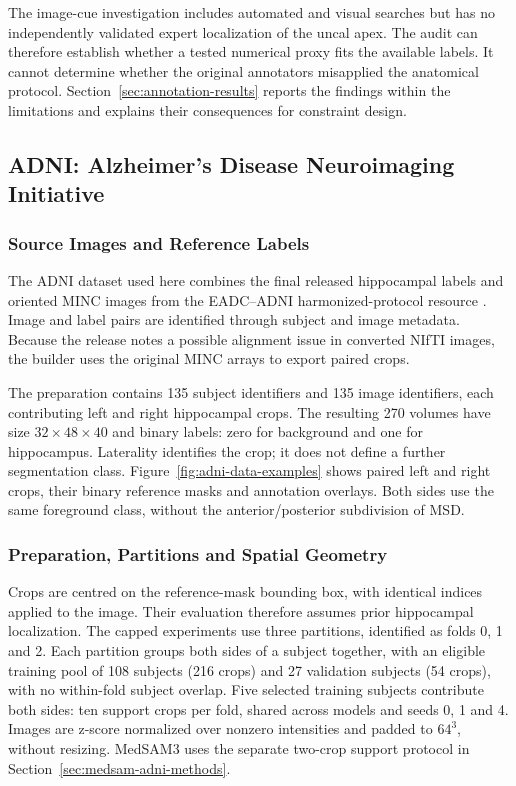 \documentclass[12pt,a4paper]{article}
\begin{document}
The image-cue investigation includes automated and visual searches but
has no independently validated expert localization of the uncal apex.
The audit can therefore establish whether a tested numerical proxy fits
the available labels. It cannot determine whether the original annotators
misapplied the anatomical protocol. Section~\ref{sec:annotation-results}
reports the findings within the limitations and explains their
consequences for constraint design.



\subsection{ADNI: Alzheimer's Disease Neuroimaging Initiative}
\label{sec:adni-methods}

\subsubsection{Source Images and Reference Labels}

The ADNI dataset used here combines the final released hippocampal labels
and oriented MINC images from the EADC--ADNI harmonized-protocol resource
\cite{harpReleasedLabels}. Image and label pairs are identified through
subject and image metadata. Because the release notes a possible
alignment issue in converted NIfTI images, the builder uses the
original MINC arrays to export paired crops.

The preparation contains 135 subject identifiers and 135 image
identifiers, each contributing left and right hippocampal crops.
The resulting 270 volumes have size $32\times48\times40$ and binary
labels: zero for background and one for hippocampus. Laterality
identifies the crop; it does not define a further segmentation class.
Figure~\ref{fig:adni-data-examples} shows paired left and right crops,
their binary reference masks and annotation overlays. Both sides use
the same foreground class, without the anterior/posterior subdivision
of MSD.

\subsubsection{Preparation, Partitions and Spatial Geometry}

Crops are centred on the reference-mask bounding box, with identical
indices applied to the image. Their evaluation therefore assumes prior
hippocampal localization. The capped experiments use three partitions,
identified as folds 0, 1 and 2. Each partition groups both sides of a
subject together, with an eligible training pool of 108 subjects
(216 crops) and 27 validation subjects (54 crops), with no within-fold
subject overlap. Five selected training subjects contribute both sides:
ten support crops per fold, shared across models and seeds 0, 1 and 4.
Images are
z-score normalized over nonzero intensities and padded to $64^3$,
without resizing. MedSAM3 uses the separate
two-crop support protocol in Section~\ref{sec:medsam-adni-methods}.
\end{document}
